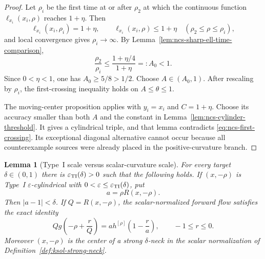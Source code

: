 \documentclass[10pt]{coll-l}
\newtheorem{lemma}[theorem]{Lemma}
\theoremstyle{definition}
\theoremstyle{remark}
\numberwithin{section}{chapter}
\numberwithin{equation}{chapter}
\begin{document}
\begin{proof}
Let $\rho_i$ be the first time at or after $\rho_2$ at which the continuous
function $\ell_{x_i}(x_i,\rho)$ reaches $1+\eta$.  Then
\begin{equation}
 \ell_{x_i}(x_i,\rho_i)=1+\eta,\qquad
 \ell_{x_i}(x_i,\rho)\leq1+\eta
       \quad(\rho_2\leq\rho\leq\rho_i),               \label{eq:ncs-first-crossing}
\end{equation}
and local convergence gives $\rho_i\to\infty$.  By
Lemma~\ref{lem:ncs-sharp-ell-time-comparison},
\begin{equation}
 \frac{\rho_2}{\rho_i}
       \leq\frac{1+\eta/4}{1+\eta}=:A_0<1.             \label{eq:ncs-crossing-ratio}
\end{equation}
Since $0<\eta<1$, one has $A_0\geq5/8>1/2$.  Choose
$A\in(A_0,1)$.  After rescaling by $\rho_i$, the first-crossing
inequality holds on $A\leq\theta\leq1$.

The moving-center proposition applies with $y_i=x_i$ and $C=1+\eta$.
Choose its accuracy smaller than both $A$ and the constant in
Lemma~\ref{lem:ncs-cylinder-threshold}.  It gives a cylindrical triple,
and that lemma contradicts \eqref{eq:ncs-first-crossing}.  Its exceptional
diagonal alternative cannot occur because all counterexample sources were
already placed in the positive-curvature branch.
\end{proof}

\begin{lemma}[Type~I scale versus scalar-curvature scale]
\label{lem:ncs-TypeI-scalar-scale-bridge}
For every target $\delta\in(0,1)$ there is
$\varepsilon_{\rm TI}(\delta)>0$ such that the following holds.  If
$(x,-\rho)$ is Type~I $\varepsilon$-cylindrical with
$0<\varepsilon\leq\varepsilon_{\rm TI}(\delta)$, put
\begin{equation}
                  a=\rho R(x,-\rho).                   \label{eq:ncs-TypeI-a}
\end{equation}
Then $|a-1|<\delta$.  If $Q=R(x,-\rho)$, the scalar-normalized forward
flow satisfies the exact identity
\begin{equation}
 Q g\!\left(-\rho+\frac rQ\right)
 =a h^{[\rho]}\!\left(1-\frac r a\right),
                    \qquad -1\leq r\leq0.             \label{eq:ncs-two-normalizations-bridge}
\end{equation}
Moreover $(x,-\rho)$ is the center of a strong $\delta$-neck in the scalar
normalization of Definition~\ref{def:ksol-strong-neck}.
\end{lemma}
\end{document}
